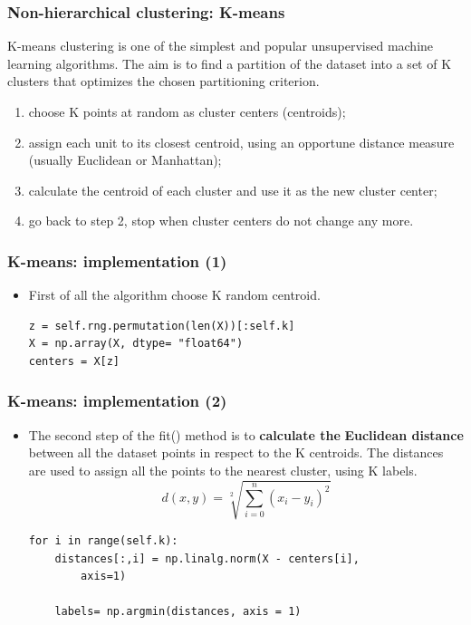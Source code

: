 \documentclass[xcolor ={table,usenames,dvipsnames}]{beamer}
\theoremstyle{definition}
\begin{document}
	\begin{frame}
		\frametitle{Non-hierarchical clustering: K-means}
		K-means clustering is one of the simplest and popular unsupervised machine learning algorithms. The aim is to find a partition of the dataset into a set of K clusters that optimizes the chosen partitioning criterion.
		
		\begin{enumerate}
			\item choose K points at random as cluster centers
			(centroids);
			\item assign each unit to its closest centroid,
			using an opportune distance measure (usually Euclidean or Manhattan);
			\item calculate the centroid of each cluster and use it as
			the new cluster center;
			\item go back to step 2, stop when cluster centers
			do not change any more.
		\end{enumerate}
	\end{frame}

	\begin{frame}[fragile]
		\frametitle{K-means: implementation (1)}
		\begin{itemize}
			\item First of all the algorithm choose K random centroid.
			\begin{lstlisting}
z = self.rng.permutation(len(X))[:self.k]
X = np.array(X, dtype= "float64")
centers = X[z]
			\end{lstlisting}
			
		\end{itemize}
	\end{frame}

	\begin{frame}[fragile]
		\frametitle{K-means: implementation (2)}
		\begin{itemize}
			\item The second step of the fit() method is to \textbf{calculate the} \textbf{Euclidean distance} between all the dataset points in respect to the K centroids. The distances are used to assign all the points to the nearest cluster, using K labels. 
			$$d(x,y) = \sqrt[2]{\sum_{i=0}^n (x_{i} - y_{i})^{2}} $$
			\begin{lstlisting}
for i in range(self.k):
	distances[:,i] = np.linalg.norm(X - centers[i],
		axis=1)	
			
	labels= np.argmin(distances, axis = 1)
			\end{lstlisting}
		\end{itemize}
		
	\end{frame}
\end{document}
